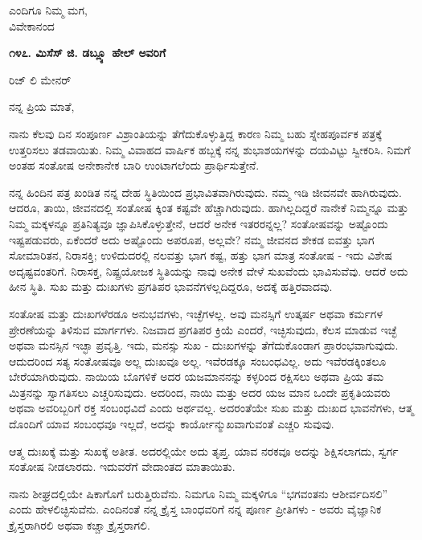 \begin{flushright}
ಎಂದಿಗೂ ನಿಮ್ಮ ಮಗ,\\ವಿವೇಕಾನಂದ
\end{flushright}

\begin{center}
\textbf{೧೪೭. ಮಿಸೆಸ್ ಜಿ. ಡಬ್ಲ್ಯೂ ಹೇಲ್ ಅವರಿಗೆ}
\end{center}

\begin{flushright}
ರಿಜ್ ಲಿ ಮೇನರ್
\end{flushright}

ನನ್ನ ಪ್ರಿಯ ಮಾತೆ,

ನಾನು ಕೆಲವು ದಿನ ಸಂಪೂರ್ಣ ವಿಶ್ರಾಂತಿಯನ್ನು ತೆಗೆದುಕೊಳ್ಳುತ್ತಿದ್ದ ಕಾರಣ ನಿಮ್ಮ ಬಹು ಸ್ನೇಹಪೂರ್ವಕ ಪತ್ರಕ್ಕೆ ಉತ್ತರಿಸಲು ತಡವಾಯಿತು. ನಿಮ್ಮ ವಿವಾಹದ ವಾರ್ಷಿಕ ಹಬ್ಬಕ್ಕೆ ನನ್ನ ಶುಭಾಶಯಗಳನ್ನು ದಯವಿಟ್ಟು ಸ್ವೀಕರಿಸಿ. ನಿಮಗೆ ಅಂತಹ ಸಂತೋಷ ಅನೇಕಾನೇಕ ಬಾರಿ ಉಂಟಾಗಲೆಂದು ಪ್ರಾರ್ಥಿಸುತ್ತೇನೆ.

ನನ್ನ ಹಿಂದಿನ ಪತ್ರ ಖಂಡಿತ ನನ್ನ ದೇಹ ಸ್ಥಿತಿಯಿಂದ ಪ್ರಭಾವಿತವಾಗಿರುವುದು. ನಮ್ಮ ಇಡಿ ಜೀವನವೇ ಹಾಗಿರುವುದು. ಆದರೂ, ತಾಯಿ, ಜೀವನದಲ್ಲಿ ಸಂತೋಷ ಕ್ಕಿಂತ ಕಷ್ಟವೇ ಹೆಚ್ಚಾಗಿರುವುದು. ಹಾಗಿಲ್ಲದಿದ್ದರೆ ನಾನೇಕೆ ನಿಮ್ಮನ್ನೂ ಮತ್ತು ನಿಮ್ಮ ಮಕ್ಕಳನ್ನೂ ಪ್ರತಿನಿತ್ಯವೂ ಜ್ಞಾಪಿಸಿಕೊಳ್ಳುತ್ತೇನೆ, ಆದರೆ ಅನೇಕ ಇತರರನ್ನಲ್ಲ? ಸಂತೋಷವನ್ನು ಅಷ್ಟೊಂದು ಇಷ್ಟಪಡುವರು, ಏಕೆಂದರೆ ಅದು ಅಷ್ಟೊಂದು ಅಪರೂಪ, ಅಲ್ಲವೇ? ನಮ್ಮ ಜೀವನದ ಶೇಕಡ ಐವತ್ತು ಭಾಗ ಸೋಮಾರಿತನ, ನಿರಾಸಕ್ತಿ; ಉಳಿದುದರಲ್ಲಿ ನಲವತ್ತು ಭಾಗ ಕಷ್ಟ, ಹತ್ತು ಭಾಗ ಮಾತ್ರ ಸಂತೋಷ - ಇದು ವಿಶೇಷ ಅದೃಷ್ಟವಂತರಿಗೆ. ನಿರಾಸಕ್ತ, ನಿಷ್ಪ್ರಯೋಜಕ ಸ್ಥಿತಿಯನ್ನು ನಾವು ಅನೇಕ ವೇಳೆ ಸುಖವೆಂದು ಭಾವಿಸುವೆವು. ಆದರೆ ಅದು ಹೀನ ಸ್ಥಿತಿ. ಸುಖ ಮತ್ತು ದುಃಖಗಳು ಪ್ರಗತಿಪರ ಭಾವನೆಗಳಲ್ಲದಿದ್ದರೂ, ಅದಕ್ಕೆ ಹತ್ತಿರವಾದವು.

ಸಂತೋಷ ಮತ್ತು ದುಃಖಗಳೆರಡೂ ಅನುಭವಗಳು, ಇಚ್ಛೆಗಳಲ್ಲ. ಅವು ಮನಸ್ಸಿಗೆ ಉತ್ಕರ್ಷ ಅಥವಾ ಕರ್ಮಗಳ ಪ್ರೇರಣೆಯನ್ನು ತಿಳಿಸುವ ಮಾರ್ಗಗಳು. ನಿಜವಾದ ಪ್ರಗತಿಪರ ಕ್ರಿಯೆ ಎಂದರೆ, ಇಚ್ಛಿಸುವುದು, ಕೆಲಸ ಮಾಡುವ ಇಚ್ಛೆ ಅಥವಾ ಮನಸ್ಸಿನ ಇಚ್ಛಾ ಪ್ರವೃತ್ತಿ. ಇದು, ಮನಸ್ಸು ಸುಖ - ದುಃಖಗಳನ್ನು ತೆಗೆದುಕೊಂಡಾಗ ಪ್ರಾರಂಭವಾಗುವುದು. ಆದುದರಿಂದ ಸತ್ಯ ಸಂತೋಷವೂ ಅಲ್ಲ ದುಃಖವೂ ಅಲ್ಲ. ಇವೆರಡಕ್ಕೂ ಸಂಬಂಧವಿಲ್ಲ. ಅದು ಇವೆರಡಕ್ಕಿಂತಲೂ ಬೇರೆಯಾಗಿರುವುದು. ನಾಯಿಯ ಬೊಗಳಿಕೆ ಅದರ ಯಜಮಾನನನ್ನು ಕಳ್ಳರಿಂದ ರಕ್ಷಿಸಲು ಅಥವಾ ಪ್ರಿಯ ತಮ ಮಿತ್ರನನ್ನು ಸ್ವಾಗತಿಸಲು ಎಚ್ಚರಿಸುವುದು. ಅದರಿಂದ, ನಾಯಿ ಮತ್ತು ಅದರ ಯಜ ಮಾನ ಒಂದೇ ಪ್ರಕೃತಿಯವರು ಅಥವಾ ಅವರಿಬ್ಬರಿಗೆ ರಕ್ತ ಸಂಬಂಧವಿದೆ ಎಂದು ಅರ್ಥವಲ್ಲ. ಅದರಂತೆಯೇ ಸುಖ ಮತ್ತು ದುಃಖದ ಭಾವನೆಗಳು, ಆತ್ಮ ದೊಂದಿಗೆ ಯಾವ ಸಂಬಂಧವೂ ಇಲ್ಲದೆ, ಅದನ್ನು ಕಾರ್ಯೋನ್ಮುಖವಾಗುವಂತೆ ಎಚ್ಚರಿ ಸುವುವು.

ಆತ್ಮ ದುಃಖಕ್ಕೆ ಮತ್ತು ಸುಖಕ್ಕೆ ಅತೀತ. ಅದರಲ್ಲಿಯೇ ಅದು ತೃಪ್ತ. ಯಾವ ನರಕವೂ ಅದನ್ನು ಶಿಕ್ಷಿಸಲಾಗದು, ಸ್ವರ್ಗ ಸಂತೋಷ ನೀಡಲಾರದು. ಇದುವರೆಗೆ ವೇದಾಂತದ ಮಾತಾಯಿತು.

ನಾನು ಶೀಘ್ರದಲ್ಲಿಯೇ ಷಿಕಾಗೊಗೆ ಬರುತ್ತಿರುವೆನು. ನಿಮಗೂ ನಿಮ್ಮ ಮಕ್ಕಳಿಗೂ “ಭಗವಂತನು ಆಶೀರ್ವದಿಸಲಿ” ಎಂದು ಹೇಳಲಿಚ್ಛಿಸುವೆನು. ಎಂದಿನಂತೆ ನನ್ನ ಕ್ರೈಸ್ತ ಬಾಂಧವರಿಗೆ ನನ್ನ ಪೂರ್ಣ ಪ್ರೀತಿಗಳು - ಅವರು ವೈಜ್ಞಾನಿಕ ಕ್ರೈಸ್ತರಾಗಿರಲಿ ಅಥವಾ ಕಚ್ಚಾ ಕ್ರೈಸ್ತರಾಗಲಿ.

